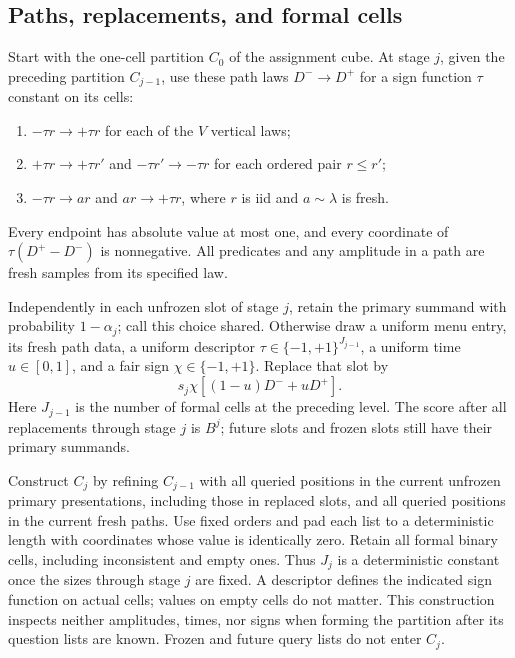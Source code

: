 \subsection{Paths, replacements, and formal cells}

Start with the one-cell partition $C_0$ of the assignment cube. At stage
$j$, given the preceding partition $C_{j-1}$, use these path laws
$D^-\longrightarrow D^+$ for a sign function $\tau$ constant on its cells:
\begin{enumerate}
\item $-\tau r\longrightarrow+\tau r$ for each of the $V$ vertical laws;
\item $+\tau r\longrightarrow+\tau r'$ and
      $-\tau r'\longrightarrow-\tau r$ for each ordered pair $r\le r'$;
\item $-\tau r\longrightarrow ar$ and $ar\longrightarrow+\tau r$,
      where $r$ is iid and $a\sim\lambda$ is fresh.
\end{enumerate}
Every endpoint has absolute value at most one, and every coordinate of
$\tau(D^+-D^-)$ is nonnegative. All predicates and any amplitude in a
path are fresh samples from its specified law.

Independently in each unfrozen slot of stage $j$, retain the primary
summand with probability
$1-\alpha_j$; call this choice shared. Otherwise draw a uniform menu
entry, its fresh path data, a uniform descriptor
$\tau\in\{-1,+1\}^{J_{j-1}}$, a uniform time $u\in[0,1]$, and a fair
sign $\chi\in\{-1,+1\}$. Replace that slot by
\[
 s_j\chi[(1-u)D^-+uD^+].
\]
Here $J_{j-1}$ is the number of formal cells at the preceding level.
The score after all replacements through stage $j$ is $B^j$; future
slots and frozen slots still have their primary summands.

Construct $C_j$ by refining $C_{j-1}$ with all queried positions in the
current unfrozen primary presentations, including those in replaced
slots, and all queried positions in the current fresh paths. Use fixed
orders and pad each list to a deterministic length with coordinates
whose value is identically zero. Retain all formal binary cells,
including inconsistent and empty ones. Thus $J_j$ is a deterministic
constant once the sizes through stage $j$ are fixed. A descriptor defines
the indicated sign function on actual cells; values on empty cells do
not matter. This construction inspects neither amplitudes, times, nor
signs when forming the partition after its question lists are known.
Frozen and future query lists do not enter $C_j$.

